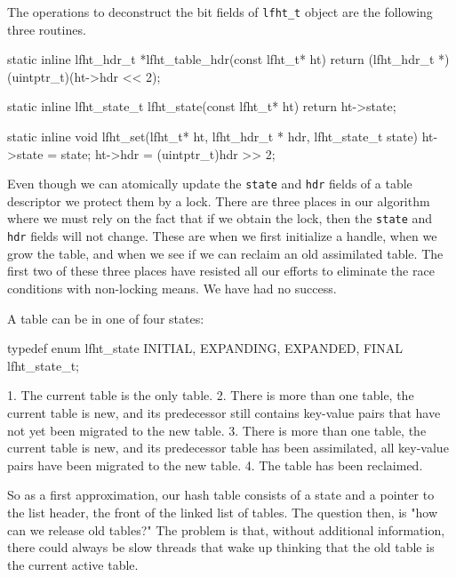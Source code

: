 The operations to deconstruct the bit fields of \texttt{lfht\_t} object are the following three
routines.
\begin{center}
\begin{clisting}
static inline lfht_hdr_t *lfht_table_hdr(const lfht_t* ht){
  return (lfht_hdr_t *)(uintptr_t)(ht->hdr << 2);
}

static inline lfht_state_t lfht_state(const lfht_t* ht){
  return ht->state;
}

static inline void lfht_set(lfht_t* ht, lfht_hdr_t * hdr, lfht_state_t state){
  ht->state = state;
  ht->hdr = (uintptr_t)hdr >> 2;
}
\end{clisting}
\end{center}


Even though we can atomically update the \texttt{state} and
\texttt{hdr} fields of a table descriptor we protect them by a lock. There are three
places in our algorithm where we must rely on the fact that if we obtain
the lock, then the \texttt{state} and \texttt{hdr} fields will not
change.  These are when we first initialize a handle, when we grow the
table, and when we see if we can reclaim an old assimilated table.
The first two of these three places have resisted all our efforts to eliminate the race conditions
with non-locking means. We have had no success.


A table can be in one of four states:

\begin{center}
\begin{clisting}
typedef enum lfht_state { INITIAL, EXPANDING, EXPANDED, FINAL } lfht_state_t;
\end{clisting}
\end{center}

1. The current table is the only table. 2. There is more than one table, the current table is new, and its
predecessor still contains key-value pairs that have not yet been
migrated to the new table. 3. There is more than one table, the current table is new, and its
predecessor table has been assimilated, all key-value pairs have been
migrated to the new table. 4. The table has been reclaimed.

So as a first approximation, our hash table consists of a state and a
pointer to the list header, the front of the linked list of tables.
The question then, is "how can we release old tables?" The problem is
that, without additional information, there could always be slow
threads that wake up thinking that the old table is the current active
table.

